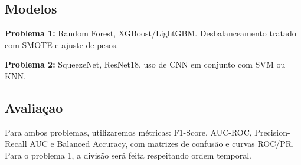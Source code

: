 \documentclass[10pt,twocolumn,letterpaper]{article}
\begin{document}
\subsection{Modelos}
\textbf{Problema 1:}
Random Forest, XGBoost/LightGBM.
Desbalanceamento tratado com SMOTE e ajuste de
pesos.

\textbf{Problema 2:}
SqueezeNet, ResNet18, uso de CNN em conjunto com SVM ou KNN\cite{Mary2023,Rafique2023}.

\subsection{Avaliaçao}
Para ambos problemas, utilizaremos métricas: F1-Score, AUC-ROC, Precision-Recall AUC e Balanced
Accuracy, com matrizes de confusão e curvas ROC/PR. Para o problema 1, a divisão será feita respeitando ordem temporal.

\newpage
{\small


}
\end{document}
